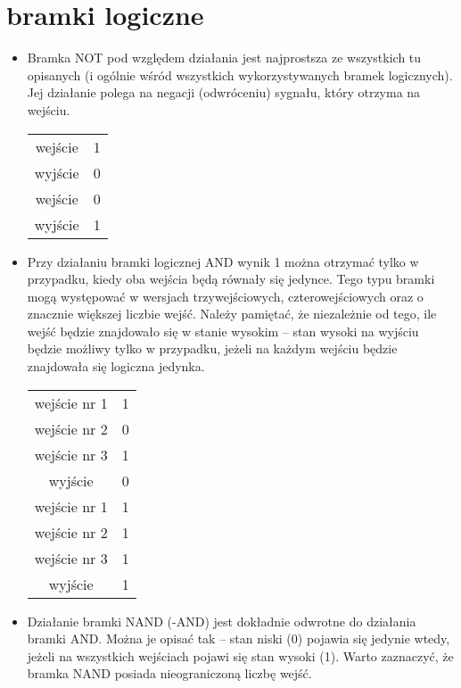 \documentclass[11pt]{article}
\begin{document}
\section{bramki logiczne}
\centering
\begin{itemize}
\item Bramka NOT pod względem działania jest najprostsza ze wszystkich tu opisanych (i ogólnie wśród wszystkich wykorzystywanych bramek logicznych). Jej działanie polega na negacji (odwróceniu) sygnału, który otrzyma na wejściu.
\begin{table}[h]
\centering
\begin{tabular}{|c|c|}
\hline
wejście&1\\
wyjście&0\\
\hline
\hline
wejście&0\\
wyjście&1\\
\hline
\end{tabular}
\end{table}
\item Przy działaniu bramki logicznej AND wynik 1 można otrzymać tylko w przypadku, kiedy oba wejścia będą równały się jedynce. Tego typu bramki mogą występować w wersjach trzywejściowych, czterowejściowych oraz o znacznie większej liczbie wejść. Należy pamiętać, że niezależnie od tego, ile wejść będzie znajdowało się w stanie wysokim – stan wysoki na wyjściu będzie możliwy tylko w przypadku, jeżeli na każdym wejściu będzie znajdowała się logiczna jedynka.
\begin{table}[h]
\centering
\begin{tabular}{|c|c|}
\hline
wejście nr 1&1\\
wejście nr 2&0\\
wejście nr 3&1\\
wyjście&0\\
\hline
\hline
wejście nr 1&1\\
wejście nr 2&1\\
wejście nr 3&1\\
wyjście&1\\
\hline
\end{tabular}
\end{table}
\newpage
\item Działanie bramki NAND (-AND) jest dokładnie odwrotne do działania bramki AND. Można je  opisać tak – stan niski (0) pojawia się jedynie wtedy, jeżeli na wszystkich wejściach pojawi się stan wysoki (1). Warto zaznaczyć, że bramka NAND posiada nieograniczoną liczbę wejść.
\begin{table}[h]
\centering

\end{table}
\end{itemize}
\end{document}
